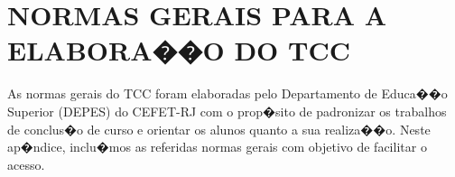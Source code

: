 \section{NORMAS GERAIS PARA A ELABORA��O DO  TCC} \label{ap:normas}

As normas gerais do TCC foram elaboradas pelo Departamento de Educa��o Superior (DEPES)
do CEFET-RJ com o prop�sito de padronizar os trabalhos de conclus�o de curso e orientar os
alunos quanto a sua realiza��o.
%
%
Neste ap�ndice, inclu�mos as referidas normas gerais com objetivo de facilitar o acesso.   



